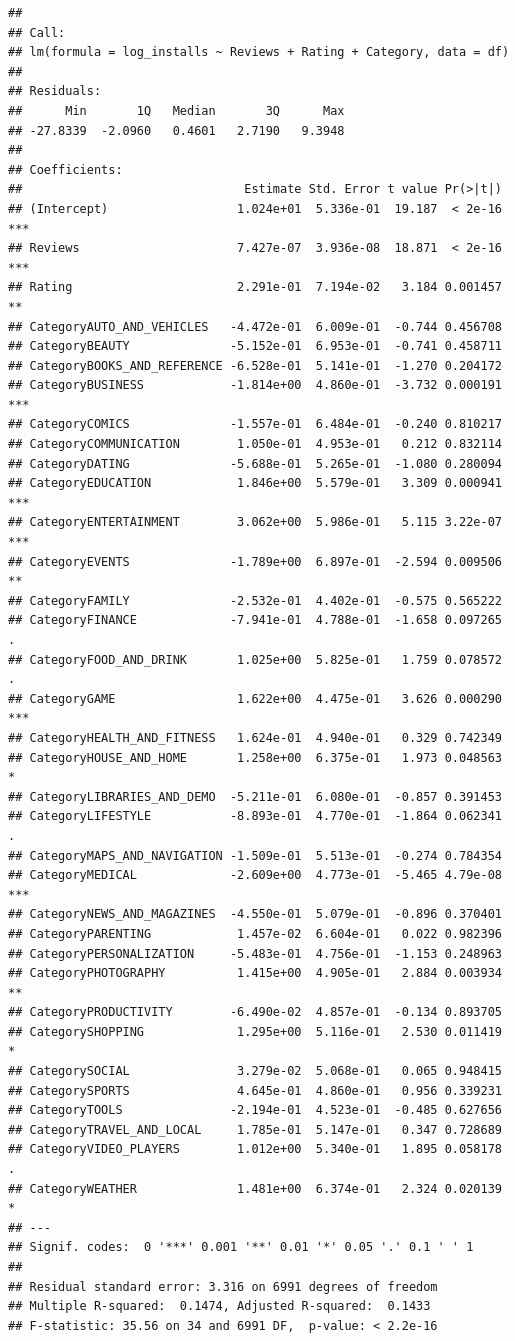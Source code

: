 \documentclass[
]{article}
\begin{document}
\begin{verbatim}
## 
## Call:
## lm(formula = log_installs ~ Reviews + Rating + Category, data = df)
## 
## Residuals:
##      Min       1Q   Median       3Q      Max 
## -27.8339  -2.0960   0.4601   2.7190   9.3948 
## 
## Coefficients:
##                               Estimate Std. Error t value Pr(>|t|)    
## (Intercept)                  1.024e+01  5.336e-01  19.187  < 2e-16 ***
## Reviews                      7.427e-07  3.936e-08  18.871  < 2e-16 ***
## Rating                       2.291e-01  7.194e-02   3.184 0.001457 ** 
## CategoryAUTO_AND_VEHICLES   -4.472e-01  6.009e-01  -0.744 0.456708    
## CategoryBEAUTY              -5.152e-01  6.953e-01  -0.741 0.458711    
## CategoryBOOKS_AND_REFERENCE -6.528e-01  5.141e-01  -1.270 0.204172    
## CategoryBUSINESS            -1.814e+00  4.860e-01  -3.732 0.000191 ***
## CategoryCOMICS              -1.557e-01  6.484e-01  -0.240 0.810217    
## CategoryCOMMUNICATION        1.050e-01  4.953e-01   0.212 0.832114    
## CategoryDATING              -5.688e-01  5.265e-01  -1.080 0.280094    
## CategoryEDUCATION            1.846e+00  5.579e-01   3.309 0.000941 ***
## CategoryENTERTAINMENT        3.062e+00  5.986e-01   5.115 3.22e-07 ***
## CategoryEVENTS              -1.789e+00  6.897e-01  -2.594 0.009506 ** 
## CategoryFAMILY              -2.532e-01  4.402e-01  -0.575 0.565222    
## CategoryFINANCE             -7.941e-01  4.788e-01  -1.658 0.097265 .  
## CategoryFOOD_AND_DRINK       1.025e+00  5.825e-01   1.759 0.078572 .  
## CategoryGAME                 1.622e+00  4.475e-01   3.626 0.000290 ***
## CategoryHEALTH_AND_FITNESS   1.624e-01  4.940e-01   0.329 0.742349    
## CategoryHOUSE_AND_HOME       1.258e+00  6.375e-01   1.973 0.048563 *  
## CategoryLIBRARIES_AND_DEMO  -5.211e-01  6.080e-01  -0.857 0.391453    
## CategoryLIFESTYLE           -8.893e-01  4.770e-01  -1.864 0.062341 .  
## CategoryMAPS_AND_NAVIGATION -1.509e-01  5.513e-01  -0.274 0.784354    
## CategoryMEDICAL             -2.609e+00  4.773e-01  -5.465 4.79e-08 ***
## CategoryNEWS_AND_MAGAZINES  -4.550e-01  5.079e-01  -0.896 0.370401    
## CategoryPARENTING            1.457e-02  6.604e-01   0.022 0.982396    
## CategoryPERSONALIZATION     -5.483e-01  4.756e-01  -1.153 0.248963    
## CategoryPHOTOGRAPHY          1.415e+00  4.905e-01   2.884 0.003934 ** 
## CategoryPRODUCTIVITY        -6.490e-02  4.857e-01  -0.134 0.893705    
## CategorySHOPPING             1.295e+00  5.116e-01   2.530 0.011419 *  
## CategorySOCIAL               3.279e-02  5.068e-01   0.065 0.948415    
## CategorySPORTS               4.645e-01  4.860e-01   0.956 0.339231    
## CategoryTOOLS               -2.194e-01  4.523e-01  -0.485 0.627656    
## CategoryTRAVEL_AND_LOCAL     1.785e-01  5.147e-01   0.347 0.728689    
## CategoryVIDEO_PLAYERS        1.012e+00  5.340e-01   1.895 0.058178 .  
## CategoryWEATHER              1.481e+00  6.374e-01   2.324 0.020139 *  
## ---
## Signif. codes:  0 '***' 0.001 '**' 0.01 '*' 0.05 '.' 0.1 ' ' 1
## 
## Residual standard error: 3.316 on 6991 degrees of freedom
## Multiple R-squared:  0.1474, Adjusted R-squared:  0.1433 
## F-statistic: 35.56 on 34 and 6991 DF,  p-value: < 2.2e-16
\end{verbatim}
\end{document}
